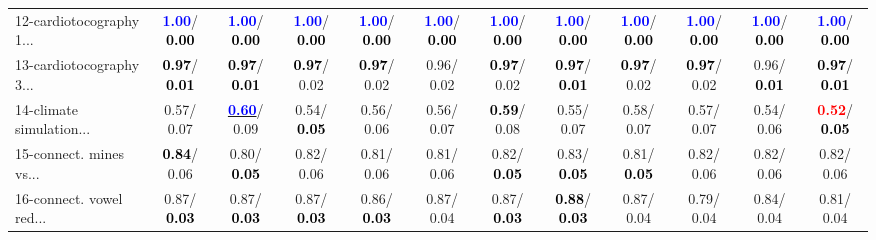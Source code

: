 \begin{table}[h]
\begin{center}
{\begin{tabular}{lc|c|c|c|c|c|c|c|c|c|c}
12-cardiotocography 1... & \textcolor{blue}{\textbf{  1.00}}/\textcolor{black}{\textbf{  0.00}} & \textcolor{blue}{\textbf{  1.00}}/\textcolor{black}{\textbf{  0.00}} & \textcolor{blue}{\textbf{  1.00}}/\textcolor{black}{\textbf{  0.00}} & \textcolor{blue}{\textbf{  1.00}}/\textcolor{black}{\textbf{  0.00}} & \textcolor{blue}{\textbf{  1.00}}/\textcolor{black}{\textbf{  0.00}} & \textcolor{blue}{\textbf{  1.00}}/\textcolor{black}{\textbf{  0.00}} & \textcolor{blue}{\textbf{  1.00}}/\textcolor{black}{\textbf{  0.00}} & \textcolor{blue}{\textbf{  1.00}}/\textcolor{black}{\textbf{  0.00}} & \textcolor{blue}{\textbf{  1.00}}/\textcolor{black}{\textbf{  0.00}} & \textcolor{blue}{\textbf{  1.00}}/\textcolor{black}{\textbf{  0.00}} & \textcolor{blue}{\textbf{  1.00}}/\textcolor{black}{\textbf{  0.00}} \\
13-cardiotocography 3... & \textcolor{black}{\textbf{  0.97}}/\textcolor{black}{\textbf{  0.01}} & \textcolor{black}{\textbf{  0.97}}/\textcolor{black}{\textbf{  0.01}} & \textcolor{black}{\textbf{  0.97}}/  0.02 & \textcolor{black}{\textbf{  0.97}}/  0.02 &   0.96/  0.02 & \textcolor{black}{\textbf{  0.97}}/  0.02 & \textcolor{black}{\textbf{  0.97}}/\textcolor{black}{\textbf{  0.01}} & \textcolor{black}{\textbf{  0.97}}/  0.02 & \textcolor{black}{\textbf{  0.97}}/  0.02 &   0.96/\textcolor{black}{\textbf{  0.01}} & \textcolor{black}{\textbf{  0.97}}/\textcolor{black}{\textbf{  0.01}} \\
14-climate simulation... &   0.57/  0.07 & \underline{\textcolor{blue}{\textbf{  0.60}}}/  0.09 &   0.54/\textcolor{black}{\textbf{  0.05}} &   0.56/  0.06 &   0.56/  0.07 & \textcolor{black}{\textbf{  0.59}}/  0.08 &   0.55/  0.07 &   0.58/  0.07 &   0.57/  0.07 &   0.54/  0.06 & \textcolor{red}{\textbf{  0.52}}/\textcolor{black}{\textbf{  0.05}} \\ \hline
15-connect. mines vs... & \textcolor{black}{\textbf{  0.84}}/  0.06 &   0.80/\textcolor{black}{\textbf{  0.05}} &   0.82/  0.06 &   0.81/  0.06 &   0.81/  0.06 &   0.82/\textcolor{black}{\textbf{  0.05}} &   0.83/\textcolor{black}{\textbf{  0.05}} &   0.81/\textcolor{black}{\textbf{  0.05}} &   0.82/  0.06 &   0.82/  0.06 &   0.82/  0.06 \\
16-connect. vowel red... &   0.87/\textcolor{black}{\textbf{  0.03}} &   0.87/\textcolor{black}{\textbf{  0.03}} &   0.87/\textcolor{black}{\textbf{  0.03}} &   0.86/\textcolor{black}{\textbf{  0.03}} &   0.87/  0.04 &   0.87/\textcolor{black}{\textbf{  0.03}} & \textcolor{black}{\textbf{  0.88}}/\textcolor{black}{\textbf{  0.03}} &   0.87/  0.04 &   0.79/  0.04 &   0.84/  0.04 &   0.81/  0.04 \\

\end{tabular}}
\end{center}
\end{table}
